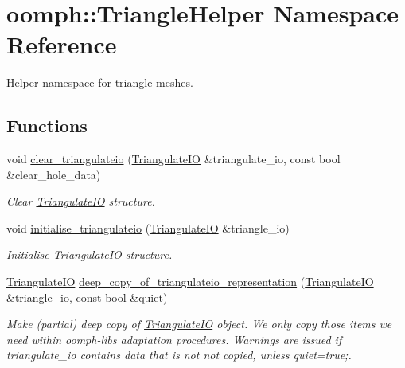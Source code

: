\hypertarget{namespaceoomph_1_1TriangleHelper}{}\section{oomph\+:\+:Triangle\+Helper Namespace Reference}
\label{namespaceoomph_1_1TriangleHelper}


Helper namespace for triangle meshes.  


\subsection*{Functions}
\begin{DoxyCompactItemize}
\item 
void \hyperlink{namespaceoomph_1_1TriangleHelper_adb064d7ba88f96c699c26d21b42bca7a}{clear\+\_\+triangulateio} (\hyperlink{structoomph_1_1TriangulateIO}{Triangulate\+IO} \&triangulate\+\_\+io, const bool \&clear\+\_\+hole\+\_\+data)
\begin{DoxyCompactList}\small\item\em Clear \hyperlink{structoomph_1_1TriangulateIO}{Triangulate\+IO} structure. \end{DoxyCompactList}\item 
void \hyperlink{namespaceoomph_1_1TriangleHelper_a884345fd8d03dda0fa3499d2c63a4f5c}{initialise\+\_\+triangulateio} (\hyperlink{structoomph_1_1TriangulateIO}{Triangulate\+IO} \&triangle\+\_\+io)
\begin{DoxyCompactList}\small\item\em Initialise \hyperlink{structoomph_1_1TriangulateIO}{Triangulate\+IO} structure. \end{DoxyCompactList}\item 
\hyperlink{structoomph_1_1TriangulateIO}{Triangulate\+IO} \hyperlink{namespaceoomph_1_1TriangleHelper_aebd618de1bc6e9f00c05e6bdd0169d8a}{deep\+\_\+copy\+\_\+of\+\_\+triangulateio\+\_\+representation} (\hyperlink{structoomph_1_1TriangulateIO}{Triangulate\+IO} \&triangle\+\_\+io, const bool \&quiet)
\begin{DoxyCompactList}\small\item\em Make (partial) deep copy of \hyperlink{structoomph_1_1TriangulateIO}{Triangulate\+IO} object. We only copy those items we need within oomph-\/lib\textquotesingle{}s adaptation procedures. Warnings are issued if triangulate\+\_\+io contains data that is not not copied, unless quiet=true;. \end{DoxyCompactList}\item 

\end{DoxyCompactItemize}
